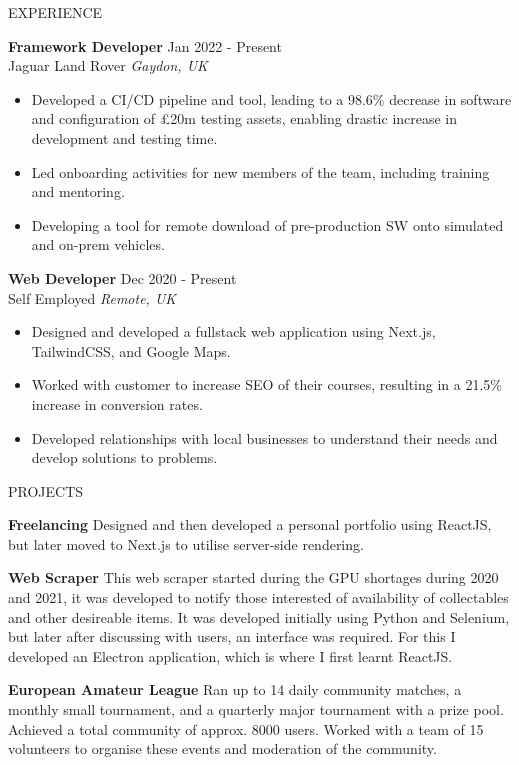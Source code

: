 \documentclass{resume} %
\begin{document}
\begin{rSection}{EXPERIENCE}

\textbf{Framework Developer} \hfill Jan 2022 - Present\\
Jaguar Land Rover \hfill \textit{Gaydon, UK}
  \begin{itemize}
    \itemsep -3pt {}
      \item Developed a CI/CD pipeline and tool, leading to a 98.6\% decrease in software and configuration of £20m testing assets, enabling drastic increase in development and testing time.
      \item Led onboarding activities for new members of the team, including training and mentoring.
      \item Developing a tool for remote download of pre-production SW onto simulated and on-prem vehicles.
  \end{itemize}

\textbf{Web Developer} \hfill Dec 2020 - Present\\
Self Employed \hfill \textit{Remote, UK}
  \begin{itemize}
    \itemsep -3pt {}
      \item Designed and developed a fullstack web application using Next.js, TailwindCSS, and Google Maps.
      \item Worked with customer to increase SEO of their courses, resulting in a 21.5\% increase in conversion rates.
      \item Developed relationships with local businesses to understand their needs and develop solutions to problems.
  \end{itemize}

\end{rSection}


\begin{rSection}{PROJECTS}
\vspace{-1.25em}
\item \textbf{Freelancing} {Designed and then developed a personal portfolio using ReactJS, but later moved to Next.js to utilise server-side rendering.}
\item \textbf{Web Scraper} {This web scraper started during the GPU shortages during 2020 and 2021, it was developed to notify those interested of availability of collectables and other desireable items. It was developed initially using Python and Selenium, but later after discussing with users, an interface was required. For this I developed an Electron application, which is where I first learnt ReactJS.}
\item \textbf{European Amateur League} {Ran up to 14 daily community matches, a monthly small tournament, and a quarterly major tournament with a prize pool. Achieved a total community of approx. 8000 users. Worked with a team of 15 volunteers to organise these events and moderation of the community.}
\end{rSection}
\end{document}
